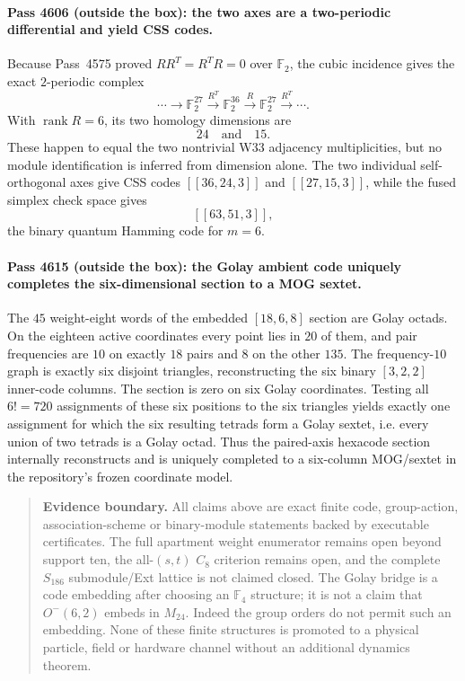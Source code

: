 \paragraph{Pass 4606 (outside the box): the two axes are a two-periodic differential and yield CSS codes.}
Because Pass~4575 proved
$RR^T=R^TR=0$ over $\mathbb F_2$, the cubic incidence gives the exact
$2$-periodic complex
\[
 \cdots\to\mathbb F_2^{27}\xrightarrow{R^T}\mathbb F_2^{36}
 \xrightarrow{R}\mathbb F_2^{27}\xrightarrow{R^T}\cdots .
\]
With $\operatorname{rank}R=6$, its two homology dimensions are
\[
 \boxed{24\quad\text{and}\quad15.}
\]
These happen to equal the two nontrivial W33 adjacency multiplicities, but no
module identification is inferred from dimension alone.  The two individual
self-orthogonal axes give CSS codes $[[36,24,3]]$ and $[[27,15,3]]$, while the
fused simplex check space gives
\[
 \boxed{[[63,51,3]]},
\]
the binary quantum Hamming code for $m=6$.

\paragraph{Pass 4615 (outside the box): the Golay ambient code uniquely completes the six-dimensional section to a MOG sextet.}
The $45$ weight-eight words of the embedded $[18,6,8]$ section are Golay octads.
On the eighteen active coordinates every point lies in $20$ of them, and pair
frequencies are $10$ on exactly $18$ pairs and $8$ on the other $135$.  The
frequency-$10$ graph is exactly six disjoint triangles, reconstructing the six
binary $[3,2,2]$ inner-code columns.  The section is zero on six Golay
coordinates.  Testing all $6!=720$ assignments of these six positions to the
six triangles yields exactly one assignment for which the six resulting tetrads
form a Golay sextet, i.e. every union of two tetrads is a Golay octad.  Thus the
paired-axis hexacode section internally reconstructs and is uniquely completed
to a six-column MOG/sextet in the repository's frozen coordinate model.

\begin{quote}\small
\textbf{Evidence boundary.}
All claims above are exact finite code, group-action, association-scheme or
binary-module statements backed by executable certificates.  The full apartment
weight enumerator remains open beyond support ten, the all-$(s,t)$ $C_8$
criterion remains open, and the complete $S_{186}$ submodule/Ext lattice is not
claimed closed.  The Golay bridge is a code embedding after choosing an
$\mathbb F_4$ structure; it is not a claim that $O^-(6,2)$ embeds in $M_{24}$.
Indeed the group orders do not permit such an embedding.  None of these finite
structures is promoted to a physical particle, field or hardware channel without
an additional dynamics theorem.
\end{quote}
